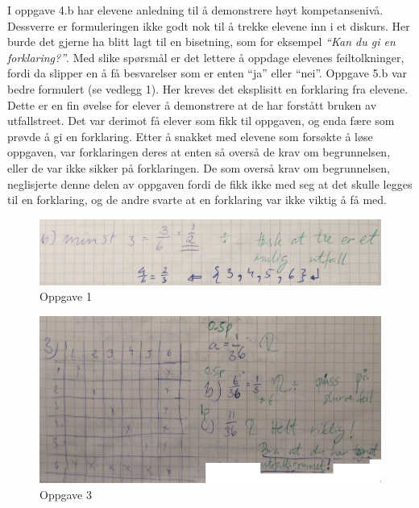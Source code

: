 \documentclass[main.tex]{subfiles}
\begin{document}
I oppgave 4.b har elevene anledning til å demonstrere høyt kompetansenivå. Dessverre er formuleringen ikke
godt nok til å trekke elevene inn i et diskurs. Her burde det gjerne ha blitt lagt til en bisetning, som 
for eksempel \emph{``Kan du gi en forklaring?''}. Med slike spørsmål er det lettere å oppdage elevenes
feiltolkninger, fordi da slipper en å få besvarelser som er enten ``ja'' eller ``nei''. Oppgave 
5.b var bedre formulert (se vedlegg 1). Her kreves det eksplisitt en forklaring fra elevene.
Dette er en fin øvelse for elever å demonstrere at de har forstått bruken av utfallstreet. Det var derimot
få elever som fikk til oppgaven, og enda fære som prøvde å gi en forklaring. Etter å snakket med elevene
som forsøkte å løse oppgaven, var forklaringen deres at enten så overså de krav om begrunnelsen, eller de var
ikke sikker på forklaringen. De som overså krav om begrunnelsen, neglisjerte denne delen av oppgaven fordi
de fikk ikke med seg at det skulle legges til en forklaring, og de andre svarte at en forklaring var ikke
viktig å få med.

\begin{figure}[h]
\centering
\includegraphics[scale = 0.4]{../figures/maryam.png}
\caption{Oppgave 1}
\label{fig:maryam}
\end{figure}

\begin{figure}
\centering
\includegraphics[scale = 0.4]{../figures/maryam2.png}
\caption{Oppgave 3}
\label{fig:maryam2}
\end{figure}
\end{document}
